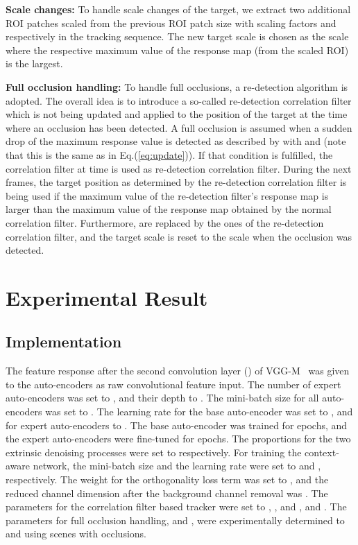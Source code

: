\documentclass[10pt,twocolumn,letterpaper]{article}
\begin{document}
\textbf{Scale changes: }
To handle scale changes of the target, we extract two additional ROI patches scaled from the previous ROI patch size with scaling factors  and  respectively in the tracking sequence. 
The new target scale is chosen as the scale where the respective maximum value of the response map (from the scaled ROI) is the largest.

\textbf{Full occlusion handling: }
To handle full occlusions, a re-detection algorithm is adopted. 
The overall idea is to introduce a so-called re-detection correlation filter which is not being updated and applied to the position of the target at the time where an occlusion has been detected. 
A full occlusion is assumed when a sudden drop of the maximum response value  is detected as described by  with  and  (note that this is the same  as in Eq.(\ref{eq:update})). If that condition is fulfilled, the correlation filter at time  is used as re-detection correlation filter. 
During the next  frames, the target position as determined by the re-detection correlation filter is being used if the maximum value of the re-detection filter's response map is larger than the maximum value of the response map obtained by the normal correlation filter. 
Furthermore,  are replaced by the ones of the re-detection correlation filter, and the target scale is reset to the scale when the occlusion was detected.

 \section{Experimental Result}

\subsection{Implementation}
The feature response after the second convolution layer () of VGG-M~\cite{ref:vggm} was given to the auto-encoders as raw convolutional feature input.
The number of expert auto-encoders was set to , and their depth to .
The mini-batch size for all auto-encoders was set to .
The learning rate for the base auto-encoder was set to , and for expert auto-encoders to .
The base auto-encoder was trained for  epochs, and the expert auto-encoders were fine-tuned for  epochs.
The proportions for the two extrinsic denoising processes were set to  respectively.
For training the context-aware network, the mini-batch size and the learning rate were set to  and , respectively.
The weight for the orthogonality loss term was set to , and the reduced channel dimension after the background channel removal was .
The parameters for the correlation filter based tracker were set to , , and , and .
The parameters for full occlusion handling,  and , were experimentally determined to  and  using scenes with occlusions.
\end{document}
